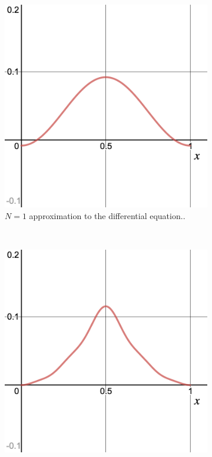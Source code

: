 \documentclass[12pt]{article} %
\begin{document}
\begin{solution}
\begin{enumerate}[(a)]
							\begin{figure}[H]
										\centering
										\begin{subfigure}[h]{0.3\textwidth}
											\includegraphics[width=\textwidth]{Figures/fund_soln_N=1.png}
											\caption{$N=1$ approximation to the differential equation..}
										\end{subfigure}
										~ 
										\begin{subfigure}[h]{0.3\textwidth}
											\includegraphics[width=\textwidth]{Figures/fund_soln_N=5.png}

\end{subfigure}
\end{figure}
\end{enumerate}
\end{solution}
\end{document}
